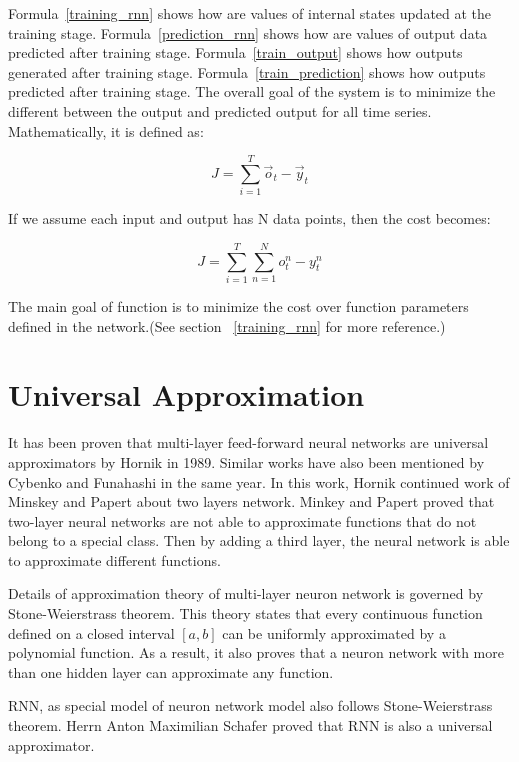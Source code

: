 \documentclass[officiallayout]{tktla}
\begin{document}
Formula~\ref{training_rnn} shows how are values of internal states updated at the training stage. Formula~\ref{prediction_rnn} shows how are values of output data predicted after training stage. Formula~\ref{train_output} shows how outputs generated after training stage. Formula~\ref{train_prediction} shows how outputs predicted after training stage. The overall goal of the system is to minimize the different between the output and predicted output for all time series. Mathematically, it is defined as:

\begin{equation}
J = \sum_{i=1}^{T}\vec{o}_{t} - \vec{y}_{t}
\end{equation}

If we assume each input and output has N data points, then the cost becomes:

\begin{equation}
J = \sum_{i=1}^{T}\sum_{n=1}^{N}o^n_{t} - y^n_{t}
\end{equation}

The main goal of function is to minimize the cost over function parameters defined in the network.(See section ~\ref{training_rnn} for more reference.)

\section{Universal Approximation}
It has been proven that multi-layer feed-forward neural networks are universal approximators by Hornik in 1989. Similar works have also been mentioned by Cybenko and Funahashi in the same year. In this work, Hornik continued work of Minskey and Papert about two layers network. Minkey and Papert proved that two-layer neural networks are not able to approximate functions that do not belong to a special class. Then 	by adding a third layer, the neural network is able to approximate different functions.

Details of approximation theory of multi-layer neuron network is governed by Stone-Weierstrass theorem. This theory states that every continuous function defined on a closed interval $[a, b]$ can be uniformly approximated by a polynomial function. As a result, it also proves that a neuron network with more than one hidden layer can approximate any function.

RNN, as special model of neuron network model also follows Stone-Weierstrass theorem. Herrn Anton Maximilian Schafer proved that RNN is also a universal approximator.
\end{document}

